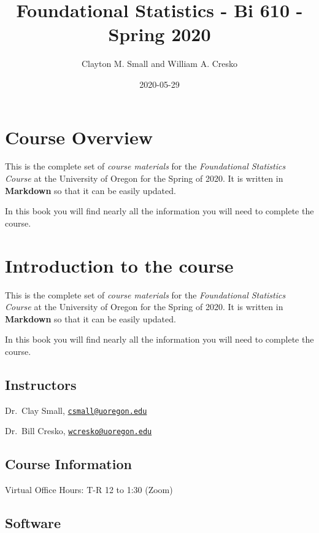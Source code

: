 \documentclass[]{book}
\title{Foundational Statistics - Bi 610 - Spring 2020}
\author{Clayton M. Small and William A. Cresko}
\date{2020-05-29}
\begin{document}
\maketitle

{
\setcounter{tocdepth}{1}
\tableofcontents
}
\hypertarget{course-overview}{%
\chapter{Course Overview}\label{course-overview}}

This is the complete set of \emph{course materials} for the \emph{Foundational Statistics Course} at the University of Oregon for the Spring of 2020. It is written in \textbf{Markdown} so that it can be easily updated.

In this book you will find nearly all the information you will need to complete the course.

\hypertarget{introduction-to-the-course}{%
\chapter{Introduction to the course}\label{introduction-to-the-course}}

This is the complete set of \emph{course materials} for the \emph{Foundational Statistics Course} at the University of Oregon for the Spring of 2020. It is written in \textbf{Markdown} so that it can be easily updated.

In this book you will find nearly all the information you will need to complete the course.

\hypertarget{instructors}{%
\section{Instructors}\label{instructors}}

Dr.~Clay Small, \href{mailto:csmall@uoregon.edu}{\nolinkurl{csmall@uoregon.edu}}

Dr.~Bill Cresko, \href{mailto:wcresko@uoregon.edu}{\nolinkurl{wcresko@uoregon.edu}}

\hypertarget{course-information}{%
\section{Course Information}\label{course-information}}

Virtual Office Hours: T-R 12 to 1:30 (Zoom)

\hypertarget{software}{%
\section{Software}\label{software}}
\end{document}
